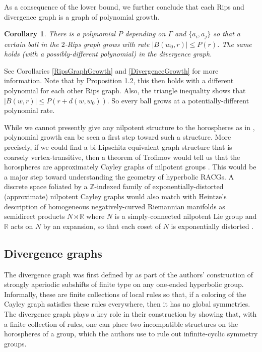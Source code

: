 \documentclass[10pt,a4paper]{amsart}
\newcommand{\R}{\mathbb{R}}
\newcommand{\Z}{\mathbb{Z}}
\newtheorem{corollary}[theorem]{Corollary}
\theoremstyle{definition}
\theoremstyle{remark}
\begin{document}
	As a consequence of the lower bound, we further conclude that each Rips and divergence graph is a graph of polynomial growth.
	
	\begin{corollary}
		
		There is a polynomial $P$ depending on $\Gamma$ and $\{a_i, a_j\}$ so that a certain ball in the $2$-Rips graph grows with rate $|B(w_0, r)|\le P(r)$. The same holds (with a possibly-different polynomial) in the divergence graph.
		
	\end{corollary}
	
	See Corollaries \ref{RipsGraphGrowth} and \ref{DivergenceGrowth} for more information. Note that by Proposition 1.2, this then holds with a different polynomial for each other Rips graph. Also, the triangle inequality shows that $|B(w, r)|\le P(r+d(w,w_0))$. So every ball grows at a potentially-different polynomial rate.
	
	While we cannot presently give any nilpotent structure to the horospheres as in \cite{PengitoreMcReynolds}, polynomial growth can be seen a first step toward such a structure. More precisely, if we could find a bi-Lipschitz equivalent graph structure that is coarsely vertex-transitive, then a theorem of Trofimov would tell us that the horospheres are approximately Cayley graphs of nilpotent groups \cite{Trofimov}. This would be a major step toward understanding the geometry of hyperbolic RACGs. A discrete space foliated by a $\Z$-indexed family of exponentially-distorted (approximate) nilpotent Cayley graphs would also match with Heintze's description of homogeneous negatively-curved Riemannian manifolds as semidirect products $N\rtimes \R$ where $N$ is a simply-connected nilpotent Lie group and $\R$ acts on $N$ by an expansion, so that each coset of $N$ is exponentially distorted \cite{Heinze}.


    \subsection*{Divergence graphs}

    The divergence graph was first defined by \cite{CGSR} as part of the authors' construction of strongly aperiodic subshifts of finite type on any one-ended hyperbolic group. Informally, these are finite collections of local rules so that, if a coloring of the Cayley graph satisfies these rules everywhere, then it has no global symmetries. The divergence graph plays a key role in their construction by showing that, with a finite collection of rules, one can place two incompatible structures on the horospheres of a group, which the authors use to rule out infinite-cyclic symmetry groups.
\end{document}
